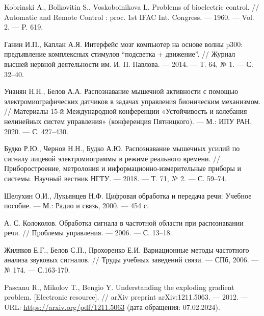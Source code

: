 
\begingroup
    \renewcommand{\section}[2]{}%
    \begin{thebibliography}{}

            Kobrinski A., Bolkovitin S., Voskoboinikova L. Problems of bioelectric control. // Automatic and Remote Control : proc. 1st IFAC Int. Congress. --- 1960. --- Vol. 2. --- P. 619.

            Ганин И.П., Каплан А.Я. Интерфейс мозг компьютер на основе волны p300: предъявление комплексных стимулов “подсветка + движение”. // Журнал высшей нервной деятельности им. И. П. Павлова. --- 2014. --- Т. 64, № 1. --- С. 32--40.

            Унанян Н.Н., Белов А.А. Распознавание мышечной активности с помощью электромиографических датчиков в задачах управления бионическим механизмом. // Материалы 15-й Международной конференции «Устойчивость и колебания нелинейных систем управления» (конференция Пятницкого). --- М.: ИПУ РАН, 2020. --- С. 427--430.

            Будко Р.Ю., Чернов Н.Н., Будко А.Ю. Распознавание мышечных усилий по сигналу лицевой электромиограммы в режиме реального времени. // Приборостроение, метролония и информационно-измерительные приборы и системы. Научный вестник НГТУ. --- 2018. --- Т. 71, № 2. --- С. 59–74.

            Шелухин О.И., Лукьянцев Н.Ф. Цифровая обработка и передача речи: Учебное пособие. --- М.: Радио и связь, 2000. --- 454 с.

            А. С. Колоколов. Обработка сигнала в частотной области при распознавании речи. // Проблемы управления. --- 2006. --- С. 13–18.
            
            Жиляков Е.Г., Белов С.П., Прохоренко Е.И. Вариационные методы частотного анализа звуковых сигналов. // Труды учебных заведений связи. --- СПб, 2006. --- № 174. --- С.163-170. 
    
            Pascanu R., Mikolov T., Bengio Y. Understanding the exploding gradient problem. [Electronic resource]. // arXiv preprint arXiv:1211.5063. --- 2012. --- URL: \url{https://arxiv.org/pdf/1211.5063} (дата обращения: 07.02.2024). 
 

\end{thebibliography}
